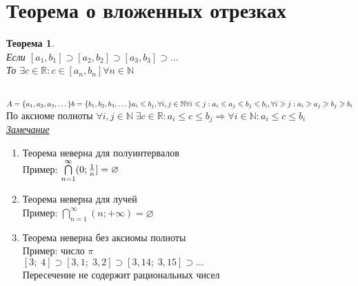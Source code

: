 \documentclass[12pt,letterpaper]{report}
\makeatletter
\newtheorem*{theorem-non}{Теорема}
\newcommand{\N}{\mathbb{N}}
\newcommand{\R}{\mathbb{R}}
\newcommand{\notice}{\underline{\textit{Замечание }}}
\renewenvironment{proof}[1][\proofname]{%
   \par\pushQED{\qed}\normalfont%
   \topsep6\p@\@plus6\p@\relax
   \trivlist\item[\hskip\labelsep\bfseries#1\@addpunct{.}]%
   \ignorespaces
}{%
   \popQED\endtrivlist\@endpefalse
}
\makeatother
\begin{document}
\section{Теорема о вложенных отрезках}
\begin{theorem-non}
    \quad \\
    Если $[a_1, b_1] \supset [a_2, b_2] \supset [a_3, b_3] \supset \dots$ \\
    То $\exists c\in \R : c \in [a_n, b_n] \forall n \in \N$
\end{theorem-non}
\begin{proof}
    \quad \\
    $A = \{a_1, a_2, a_3, \dots\} \\
    b = \{b_1, b_2, b_3, \dots\} \\
    a_i \leqslant b_j, \forall i,j \in \N \\
    \forall i \leqslant j : a_i \leqslant a_j \leqslant b_j \leqslant b_i, \forall i \geqslant j : a_i \geqslant a_j \geqslant b_j \geqslant b_i$ \\
    По аксиоме полноты $\forall i, j \in \N \; \exists c \in \R: a_i \leqslant c \leqslant b_j \Longrightarrow \forall i \in \N : a_i \leqslant c \leqslant b_i$ \\
\end{proof}
\notice
\begin{enumerate}
    \item Теорема неверна для полуинтервалов \\
    Пример: $\bigcap\limits_{n = 1}^{\infty}(0; {{1}\over{n}}] = \varnothing$
    \item Теорема неверна для лучей \\
    Пример: $\bigcap\limits_{n = 1}^{\infty}(n; +\infty) = \varnothing$
    \item Теорема неверна без аксиомы полноты \\
    Пример: число $\pi$ \\
    $[3;\; 4] \supset [3,1;\; 3,2] \supset [3,14;\; 3,15] \supset \dots$ \\
    Пересечение не содержит рациональных чисел
\end{enumerate}
\end{document}
